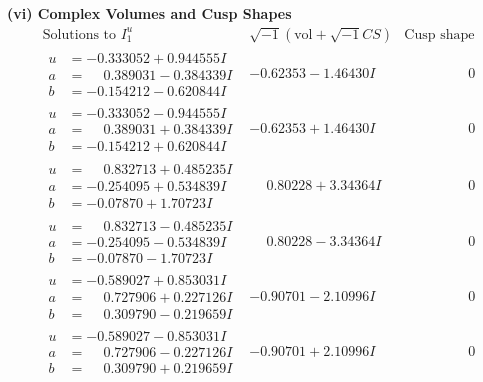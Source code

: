 \documentclass[1p]{elsarticle_modified}
\theoremstyle{definition}
\newcommand{\I}{\sqrt{-1}}
\begin{document}
\newpage\flushleft \textbf{(vi) Complex Volumes and Cusp Shapes}
$$\begin{array}{c|c|c}  
\text{Solutions to }I^u_{1}& \I (\text{vol} + \sqrt{-1}CS) & \text{Cusp shape}\\
 \hline 
\begin{aligned}
u &= -0.333052 + 0.944555 I \\
a &= \phantom{-}0.389031 - 0.384339 I \\
b &= -0.154212 - 0.620844 I\end{aligned}
 & -0.62353 - 1.46430 I & \phantom{-0.000000 } 0 \\ \hline\begin{aligned}
u &= -0.333052 - 0.944555 I \\
a &= \phantom{-}0.389031 + 0.384339 I \\
b &= -0.154212 + 0.620844 I\end{aligned}
 & -0.62353 + 1.46430 I & \phantom{-0.000000 } 0 \\ \hline\begin{aligned}
u &= \phantom{-}0.832713 + 0.485235 I \\
a &= -0.254095 + 0.534839 I \\
b &= -0.07870 + 1.70723 I\end{aligned}
 & \phantom{-}0.80228 + 3.34364 I & \phantom{-0.000000 } 0 \\ \hline\begin{aligned}
u &= \phantom{-}0.832713 - 0.485235 I \\
a &= -0.254095 - 0.534839 I \\
b &= -0.07870 - 1.70723 I\end{aligned}
 & \phantom{-}0.80228 - 3.34364 I & \phantom{-0.000000 } 0 \\ \hline\begin{aligned}
u &= -0.589027 + 0.853031 I \\
a &= \phantom{-}0.727906 + 0.227126 I \\
b &= \phantom{-}0.309790 - 0.219659 I\end{aligned}
 & -0.90701 - 2.10996 I & \phantom{-0.000000 } 0 \\ \hline\begin{aligned}
u &= -0.589027 - 0.853031 I \\
a &= \phantom{-}0.727906 - 0.227126 I \\
b &= \phantom{-}0.309790 + 0.219659 I\end{aligned}
 & -0.90701 + 2.10996 I & \phantom{-0.000000 } 0 \\ \hline\begin{aligned}

\end{aligned}
\end{array}$$
\end{document}
